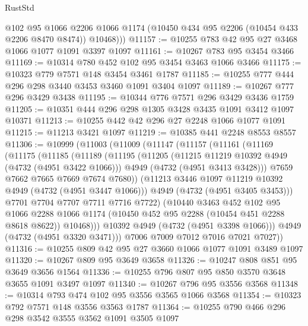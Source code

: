 \begin{lexlean}{RustStd}
\begin{coremodule}
          @102
          @95
          @1066
          @2206
          @1066
          @1174
          (@10450 @434 @95 @2206 (@10454 @433 @2206 @8470 @8474))
          @10468)))
@11157 := @10255 @783 @42 @95 @27 @3468 @1066 @1077 @1091 @3397 @1097
@11161 := @10267 @783 @95 @3454 @3466
@11169 := @10314 @780 @452 @102 @95 @3454 @3463 @1066 @3466
@11175 := @10323 @779 @7571 @148 @3454 @3461 @1787
@11185 := @10255 @777 @444 @296 @298 @3440 @3453 @3460 @1091 @3404 @1097
@11189 := @10267 @777 @296 @3429 @3438
@11195 := @10344 @776 @7571 @296 @3429 @3436 @1759
@11205 := @10351 @444 @296 @298 @1305 @3428 @3435 @1091 @3412 @1097 @10371
@11213 := @10255 @442 @42 @296 @27 @2248 @1066 @1077 @1091
@11215 := @11213 @3421 @1097
@11219 := @10385 @441 @2248 @8553 @8557
@11306 := @10999
    (@11003
      (@11009
        (@11147
          (@11157
            (@11161
              (@11169
                (@11175
                  (@11185
                    (@11189
                      (@11195
                        (@11205
                          (@11215 @11219 @10392 @4949 (@4732 (@4951 @3422 @1066)))
                          @4949
                          (@4732 (@4951 @3413 @3428)))
                        @7659
                        @7662
                        @7665
                        @7669
                        @7674
                        @7680))
                    (@11213 @3446 @1097 @11219 @10392 @4949 (@4732 (@4951 @3447 @1066)))
                    @4949
                    (@4732 (@4951 @3405 @3453)))
                  @7701
                  @7704
                  @7707
                  @7711
                  @7716
                  @7722)
                (@10440
                  @3463
                  @452
                  @102
                  @95
                  @1066
                  @2288
                  @1066
                  @1174
                  (@10450 @452 @95 @2288 (@10454 @451 @2288 @8618 @8622))
                  @10468)))
            @10392
            @4949
            (@4732 (@4951 @3398 @1066)))
          @4949
          (@4732 (@4951 @3320 @3471)))
        @7006
        @7009
        @7012
        @7016
        @7021
        @7027))
@11316 := @10255 @809 @42 @95 @27 @3660 @1066 @1077 @1091 @3489 @1097
@11320 := @10267 @809 @95 @3649 @3658
@11326 := @10247 @808 @851 @95 @3649 @3656 @1564
@11336 := @10255 @796 @807 @95 @850 @3570 @3648 @3655 @1091 @3497 @1097
@11340 := @10267 @796 @95 @3556 @3568
@11348 := @10314 @793 @474 @102 @95 @3556 @3565 @1066 @3568
@11354 := @10323 @792 @7571 @148 @3556 @3563 @1787
@11364 := @10255 @790 @466 @296 @298 @3542 @3555 @3562 @1091 @3505 @1097

\end{coremodule}
\end{lexlean}
